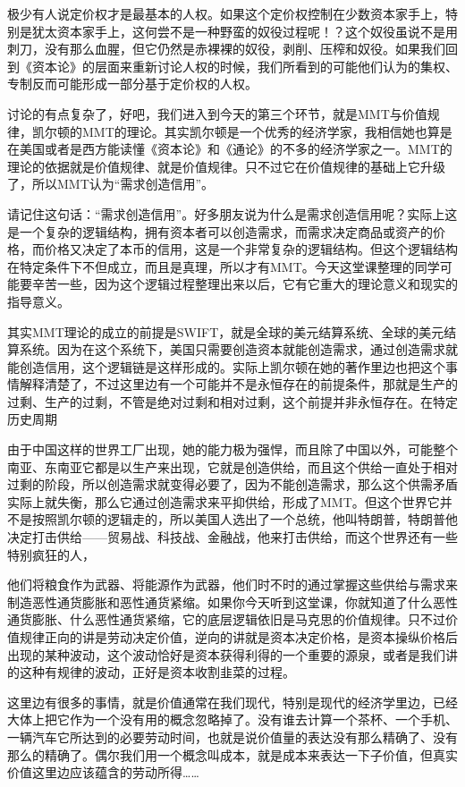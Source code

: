 \documentclass[UTF8, 12pt, a4paper]{ctexrep}
\begin{document}
极少有人说定价权才是最基本的人权。如果这个定价权控制在少数资本家手上，特别是犹太资本家手上，这何尝不是一种野蛮的奴役过程呢！？这个奴役虽说不是用刺刀，没有那么血腥，但它仍然是赤裸裸的奴役，剥削、压榨和奴役。如果我们回到《资本论》的层面来重新讨论人权的时候，我们所看到的可能他们认为的集权、专制反而可能形成一部分基于定价权的人权。

讨论的有点复杂了，好吧，我们进入到今天的第三个环节，就是MMT与价值规律，凯尔顿的MMT的理论。其实凯尔顿是一个优秀的经济学家，我相信她也算是在美国或者是西方能读懂《资本论》和《通论》的不多的经济学家之一。MMT的理论的依据就是价值规律、就是价值规律。只不过它在价值规律的基础上它升级了，所以MMT认为“需求创造信用”。

请记住这句话：“需求创造信用”。好多朋友说为什么是需求创造信用呢？实际上这是一个复杂的逻辑结构，拥有资本者可以创造需求，而需求决定商品或资产的价格，而价格又决定了本币的信用，这是一个非常复杂的逻辑结构。但这个逻辑结构在特定条件下不但成立，而且是真理，所以才有MMT。今天这堂课整理的同学可能要辛苦一些，因为这个逻辑过程整理出来以后，它有它重大的理论意义和现实的指导意义。

其实MMT理论的成立的前提是SWIFT，就是全球的美元结算系统、全球的美元结算系统。因为在这个系统下，美国只需要创造资本就能创造需求，通过创造需求就能创造信用，这个逻辑链是这样形成的。实际上凯尔顿在她的著作里边也把这个事情解释清楚了，不过这里边有一个可能并不是永恒存在的前提条件，那就是生产的过剩、生产的过剩，不管是绝对过剩和相对过剩，这个前提并非永恒存在。在特定历史周期

由于中国这样的世界工厂出现，她的能力极为强悍，而且除了中国以外，可能整个南亚、东南亚它都是以生产来出现，它就是创造供给，而且这个供给一直处于相对过剩的阶段，所以创造需求就变得必要了，因为不能创造需求，那么这个供需矛盾实际上就失衡，那么它通过创造需求来平抑供给，形成了MMT。但这个世界它并不是按照凯尔顿的逻辑走的，所以美国人选出了一个总统，他叫特朗普，特朗普他决定打击供给——贸易战、科技战、金融战，他来打击供给，而这个世界还有一些特别疯狂的人，

他们将粮食作为武器、将能源作为武器，他们时不时的通过掌握这些供给与需求来制造恶性通货膨胀和恶性通货紧缩。如果你今天听到这堂课，你就知道了什么恶性通货膨胀、什么恶性通货紧缩，它的底层逻辑依旧是马克思的价值规律。只不过价值规律正向的讲是劳动决定价值，逆向的讲就是资本决定价格，是资本操纵价格后出现的某种波动，这个波动恰好是资本获得利得的一个重要的源泉，或者是我们讲的这种有规律的波动，正好是资本收割韭菜的过程。

这里边有很多的事情，就是价值通常在我们现代，特别是现代的经济学里边，已经大体上把它作为一个没有用的概念忽略掉了。没有谁去计算一个茶杯、一个手机、一辆汽车它所达到的必要劳动时间，也就是说价值量的表达没有那么精确了、没有那么的精确了。偶尔我们用一个概念叫成本，就是成本来表达一下子价值，但真实价值这里边应该蕴含的劳动所得……
\end{document}
